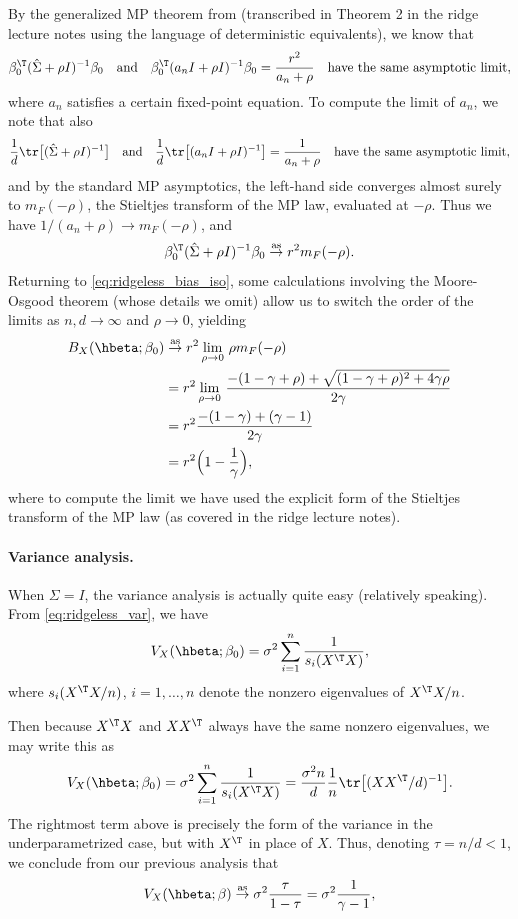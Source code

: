 \documentclass{article}
\begin{document}
By the generalized MP theorem from \citet{rubio2011spectral} (transcribed in
Theorem 2 in the ridge lecture notes using the language of deterministic
equivalents), we know that  
\[
\beta_0^\T (\hSigma + \rho I)^{-1} \beta_0 \quad \text{and} \quad 
\beta_0^\T (a_n I + \rho I)^{-1} \beta_0 = \frac{r^2}{a_n + \rho} \quad
\text{have the same asymptotic limit},
\]
where $a_n$ satisfies a certain fixed-point equation. To compute the limit of
$a_n$, we note that also
\[
\frac{1}{d} \tr \big[ (\hSigma + \rho I)^{-1} \big] \quad \text{and} \quad  
\frac{1}{d} \tr \big[ (a_n I + \rho I)^{-1} \big] = \frac{1}{a_n + \rho}
\quad \text{have the same asymptotic limit},  
\]
and by the standard MP asymptotics, the left-hand side converges almost surely
to $m_F(-\rho)$, the Stieltjes transform of the MP law, evaluated at
$-\rho$. Thus we have $1/(a_n + \rho) \to m_F(-\rho)$, and    
\[
\beta_0^\T (\hSigma + \rho I)^{-1} \beta_0 \asto r^2 m_F(-\rho). 
\]
Returning to \eqref{eq:ridgeless_bias_iso}, some calculations involving the
Moore-Osgood theorem (whose details we omit) allow us to switch the order of the
limits as $n,d \to \infty$ and $\rho \to 0$, yielding
\begin{align}
\nonumber
B_X(\hbeta; \beta_0) &\asto r^2 \lim_{\rho \to 0} \, \rho m_F(-\rho) \\
\nonumber
&= r^2 \lim_{\rho \to 0} \, \frac{-(1 - \gamma + \rho) + \sqrt{(1 - \gamma +
  \rho)^2 + 4 \gamma \rho}}{2 \gamma} \\
\nonumber
&= r^2 \frac{-(1-\gamma) + (\gamma-1)}{2 \gamma} \\
\label{eq:ridgeless_bias_iso_limit}
&= r^2 \Big( 1- \frac{1}{\gamma} \Big),
\end{align}
where to compute the limit we have used the explicit form of the Stieltjes
transform of the MP law (as covered in the ridge lecture notes).

\paragraph{Variance analysis.}

When $\Sigma = I$, the variance analysis is actually quite easy (relatively
speaking). From \eqref{eq:ridgeless_var}, we have
\[
V_X(\hbeta; \beta_0) = \sigma^2 \sum_{i=1}^n \frac{1}{s_i(X^\T X)},
\]
where $s_i(X^\T X/n)$, $i=1,\dots,n$ denote the nonzero eigenvalues of $X^\T  
X/n$. 

Then because $X^\T X$ and $XX^\T$ always have the same nonzero eigenvalues, we
may write this as 
\[
V_X(\hbeta; \beta_0) = \sigma^2 \sum_{i=1}^n \frac{1}{s_i(X^\T X)} = 
\frac{\sigma^2 n}{d} \frac{1}{n} \tr\big[ (XX^\T /d)^{-1} \big].
\]
The rightmost term above is precisely the form of the variance in the
underparametrized case, but with $X^\T$ in place of $X$. Thus, denoting $\tau =
n/d < 1$, we conclude from our previous analysis that  
\begin{equation}
\label{eq:ridgeless_var_iso_limit}
V_X(\hbeta; \beta) \asto \sigma^2 \frac{\tau}{1-\tau} = \sigma^2 
\frac{1}{\gamma-1},  
\end{equation}
\end{document}

